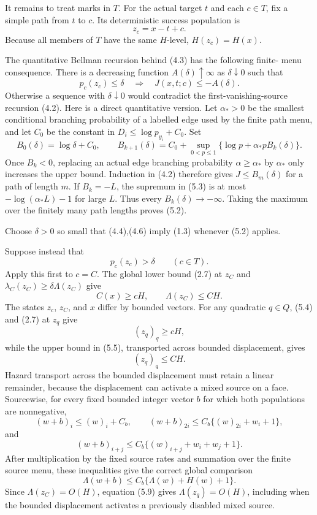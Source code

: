 It remains to treat marks in \(T\). For the actual target \(t\) and each
\(c\in T\), fix a simple path from \(t\) to \(c\). Its deterministic
success population is \[
                              z_c=x-t+c.               \tag{5.1}
\] Because all members of \(T\) have the same \(H\)-level,
\(H(z_c)=H(x)\).

The quantitative Bellman recursion behind (4.3) has the following
finite- menu consequence. There is a decreasing function
\(A(\delta)\uparrow
\infty\) as \(\delta\downarrow0\) such that \[
 p_c(z_c)\le\delta
       \quad\Longrightarrow\quad J(x,t;c)\le-A(\delta). \tag{5.2}
\] Otherwise a sequence with \(\delta\downarrow0\) would contradict the
first-vanishing-source recursion (4.2). Here is a direct quantitative
version. Let \(\alpha_*>0\) be the smallest conditional branching
probability of a labelled edge used by the finite path menu, and let
\(C_0\) be the constant in \(D_i\le\log p_{y_i}+C_0\). Set \[
 B_0(\delta)=\log\delta+C_0,\qquad
 B_{k+1}(\delta)=C_0+\sup_{0<p\le1}
       \{\log p+\alpha_*pB_k(\delta)\}.                \tag{5.3}
\] Once \(B_k<0\), replacing an actual edge branching probability
\(\alpha\ge\alpha_*\) by \(\alpha_*\) only increases the upper bound.
Induction in (4.2) therefore gives \(J\le B_m(\delta)\) for a path of
length \(m\). If \(B_k=-L\), the supremum in (5.3) is at most
\(-\log(\alpha_*L)-1\) for large \(L\). Thus every
\(B_k(\delta)\to-\infty\). Taking the maximum over the finitely many
path lengths proves (5.2).

Choose \(\delta>0\) so small that (4.4),(4.6) imply (1.3) whenever (5.2)
applies.

Suppose instead that \[
                              p_c(z_c)>\delta\qquad(c\in T). \tag{5.4}
\] Apply this first to \(c=C\). The global lower bound (2.7) at \(z_C\)
and \(\lambda_C(z_C)\ge\delta\Lambda(z_C)\) give \[
                              C(x)\ge cH,\qquad
                              \Lambda(z_C)\le CH.       \tag{5.5}
\] The states \(z_c\), \(z_C\), and \(x\) differ by bounded vectors. For
any quadratic \(q\in Q\), (5.4) and (2.7) at \(z_q\) give \[
                              (z_q)_q\ge cH,            \tag{5.6}
\] while the upper bound in (5.5), transported across bounded
displacement, gives \[
                              (z_q)_q\le CH.            \tag{5.7}
\] Hazard transport across the bounded displacement must retain a linear
remainder, because the displacement can activate a mixed source on a
face. Sourcewise, for every fixed bounded integer vector \(b\) for which
both populations are nonnegative, \[
 (w+b)_i\le (w)_i+C_b,
 \qquad
 (w+b)_{2i}\le C_b\{(w)_{2i}+w_i+1\},
\] and \[
 (w+b)_{i+j}\le
 C_b\{(w)_{i+j}+w_i+w_j+1\}.                          \tag{5.8}
\] After multiplication by the fixed source rates and summation over the
finite source menu, these inequalities give the correct global
comparison \[
              \Lambda(w+b)\le
                  C_b\{\Lambda(w)+H(w)+1\}.            \tag{5.9}
\] Since \(\Lambda(z_C)=O(H)\), equation (5.9) gives
\(\Lambda(z_q)=O(H)\), including when the bounded displacement activates
a previously disabled mixed source.

